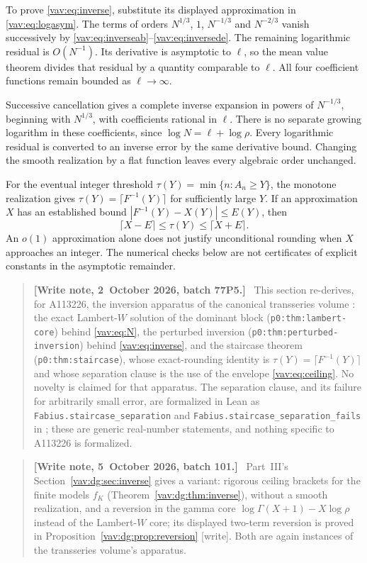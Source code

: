 \documentclass[11pt]{article}
\theoremstyle{remark}\newtheorem{remark}[theorem]{Remark}
\newenvironment{writenote}{\begin{quote}\small\raggedright\textbf{[Write note, 2~October 2026, batch 77P5.]}\ }{\end{quote}}
\newenvironment{writenoteb}{\begin{quote}\small\raggedright\textbf{[Write note, 5~October 2026, batch 101.]}\ }{\end{quote}}
\begin{document}
To prove \eqref{vav:eq:inverse}, substitute its displayed approximation
in \eqref{vav:eq:logasym}. The terms of orders
$N^{1/3}$, $1$, $N^{-1/3}$ and $N^{-2/3}$ vanish successively by
\eqref{vav:eq:inverseab}--\eqref{vav:eq:inversede}. The remaining logarithmic
residual is $O(N^{-1})$. Its derivative is asymptotic to $\ell$, so
the mean value theorem divides that residual by a quantity comparable
to $\ell$. All four coefficient functions remain bounded as
$\ell\to\infty$.

Successive cancellation gives a complete inverse expansion in powers
of $N^{-1/3}$, beginning with $N^{1/3}$, with coefficients rational
in $\ell$. There is no separate growing logarithm in these coefficients,
since $\log N=\ell+\log\rho$. Every logarithmic residual is converted
to an inverse error by the same derivative bound. Changing the smooth
realization by a flat function leaves every algebraic order unchanged.

For the eventual integer threshold
$\tau(Y)=\min\{n:A_n\ge Y\}$, the monotone realization gives
$\tau(Y)=\lceil F^{-1}(Y)\rceil$ for sufficiently large $Y$.
If an approximation $X$ has an established bound
$|F^{-1}(Y)-X(Y)|\le E(Y)$, then
\begin{equation}\label{vav:eq:ceiling}
 \lceil X-E\rceil\le\tau(Y)\le\lceil X+E\rceil.
\end{equation}
An $o(1)$ approximation alone does not justify unconditional rounding
when $X$ approaches an integer. The numerical checks below are not
certificates of explicit constants in the asymptotic remainder.
\begin{writenote}
This section re-derives, for A113226, the inversion apparatus of the
canonical transseries volume
:
the exact Lambert-$W$ solution of the dominant block
(\texttt{p0:thm:lambert-core}) behind \eqref{vav:eq:N}, the perturbed
inversion (\texttt{p0:thm:perturbed-inversion}) behind
\eqref{vav:eq:inverse}, and the staircase theorem
(\texttt{p0:thm:staircase}), whose exact-rounding identity is
$\tau(Y)=\lceil F^{-1}(Y)\rceil$ and whose separation clause is the
use of the envelope \eqref{vav:eq:ceiling}. No novelty is claimed
for that apparatus. The separation clause, and its failure for arbitrarily
small error, are formalized in Lean as \texttt{Fabius.staircase\_separation}
and \texttt{Fabius.staircase\_separation\_fails} in
;
these are generic real-number statements, and nothing specific to
A113226 is formalized.
\end{writenote}
\begin{writenoteb}
Part~III's Section~\ref{vav:dg:sec:inverse} gives a variant: rigorous
ceiling brackets for the finite models $f_K$
(Theorem~\ref{vav:dg:thm:inverse}), without a smooth realization, and a
reversion in the gamma core $\log\Gamma(X+1)-X\log\rho$ instead of the
Lambert-$W$ core; its displayed two-term reversion is proved in
Proposition~\ref{vav:dg:prop:reversion} [write]. Both are again instances
of the transseries volume's apparatus.
\end{writenoteb}
\end{document}
